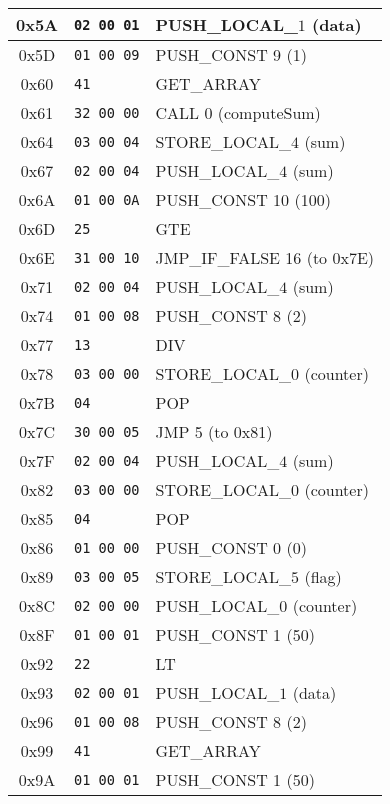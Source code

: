 \documentclass[a4paper,12pt]{article}
\begin{document}
\begin{longtable}{|c|l|p{6cm}|}
    0x5A & \texttt{02 00 01} & PUSH\_LOCAL\_$1$ (data) \\ \hline
    0x5D & \texttt{01 00 09} & PUSH\_CONST 9 (1) \\ \hline
    0x60 & \texttt{41} & GET\_ARRAY \\ \hline
    0x61 & \texttt{32 00 00} & CALL 0 (computeSum) \\ \hline
    0x64 & \texttt{03 00 04} & STORE\_LOCAL\_$4$ (sum) \\ \hline
    0x67 & \texttt{02 00 04} & PUSH\_LOCAL\_$4$ (sum) \\ \hline
    0x6A & \texttt{01 00 0A} & PUSH\_CONST 10 (100) \\ \hline
    0x6D & \texttt{25} & GTE \\ \hline
    0x6E & \texttt{31 00 10} & JMP\_IF\_FALSE 16 (to 0x7E) \\ \hline
    0x71 & \texttt{02 00 04} & PUSH\_LOCAL\_$4$ (sum) \\ \hline
    0x74 & \texttt{01 00 08} & PUSH\_CONST 8 (2) \\ \hline
    0x77 & \texttt{13} & DIV \\ \hline
    0x78 & \texttt{03 00 00} & STORE\_LOCAL\_$0$ (counter) \\ \hline
    0x7B & \texttt{04} & POP \\ \hline
    0x7C & \texttt{30 00 05} & JMP 5 (to 0x81) \\ \hline
    0x7F & \texttt{02 00 04} & PUSH\_LOCAL\_$4$ (sum) \\ \hline
    0x82 & \texttt{03 00 00} & STORE\_LOCAL\_$0$ (counter) \\ \hline
    0x85 & \texttt{04} & POP \\ \hline
    0x86 & \texttt{01 00 00} & PUSH\_CONST 0 (0) \\ \hline
    0x89 & \texttt{03 00 05} & STORE\_LOCAL\_$5$ (flag) \\ \hline
    0x8C & \texttt{02 00 00} & PUSH\_LOCAL\_$0$ (counter) \\ \hline
    0x8F & \texttt{01 00 01} & PUSH\_CONST 1 (50) \\ \hline
    0x92 & \texttt{22} & LT \\ \hline
    0x93 & \texttt{02 00 01} & PUSH\_LOCAL\_$1$ (data) \\ \hline
    0x96 & \texttt{01 00 08} & PUSH\_CONST 8 (2) \\ \hline
    0x99 & \texttt{41} & GET\_ARRAY \\ \hline
    0x9A & \texttt{01 00 01} & PUSH\_CONST 1 (50) \\ \hline

\end{longtable}
\end{document}
